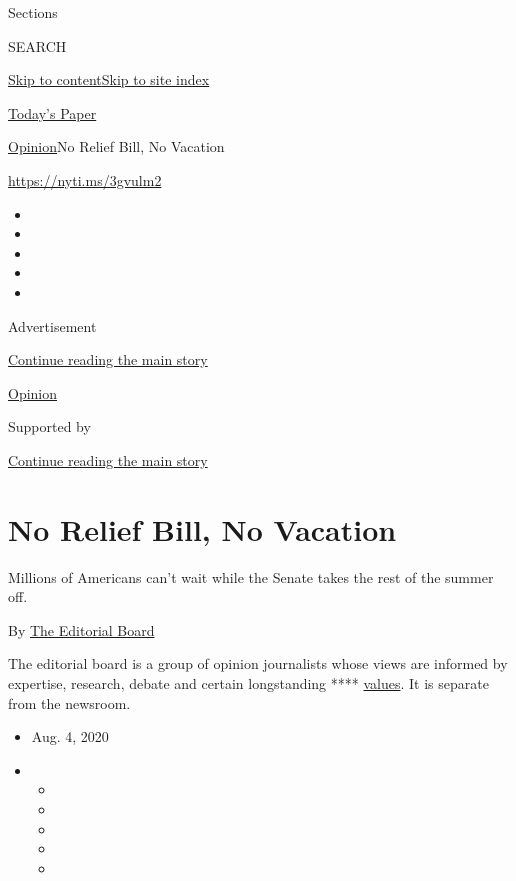 Sections

SEARCH

\protect\hyperlink{site-content}{Skip to
content}\protect\hyperlink{site-index}{Skip to site index}

\href{https://myaccount.nytimes3xbfgragh.onion/auth/login?response_type=cookie\&client_id=vi}{}

\href{https://www.nytimes3xbfgragh.onion/section/todayspaper}{Today's
Paper}

\href{/section/opinion}{Opinion}\textbar{}No Relief Bill, No Vacation

\url{https://nyti.ms/3gvulm2}

\begin{itemize}
\item
\item
\item
\item
\item
\end{itemize}

Advertisement

\protect\hyperlink{after-top}{Continue reading the main story}

\href{/section/opinion}{Opinion}

Supported by

\protect\hyperlink{after-sponsor}{Continue reading the main story}

\hypertarget{no-relief-bill-no-vacation}{%
\section{No Relief Bill, No Vacation}\label{no-relief-bill-no-vacation}}

Millions of Americans can't wait while the Senate takes the rest of the
summer off.

By
\href{https://www.nytimes3xbfgragh.onion/interactive/opinion/editorialboard.html}{The
Editorial Board}

The editorial board is a group of opinion journalists whose views are
informed by expertise, research, debate and certain longstanding ****
\href{https://www.nytimes3xbfgragh.onion/interactive/2018/opinion/editorialboard.html}{values}.
It is separate from the newsroom.

\begin{itemize}
\item
  Aug. 4, 2020
\item
  \begin{itemize}
  \item
  \item
  \item
  \item
  \item
  \end{itemize}
\end{itemize}

